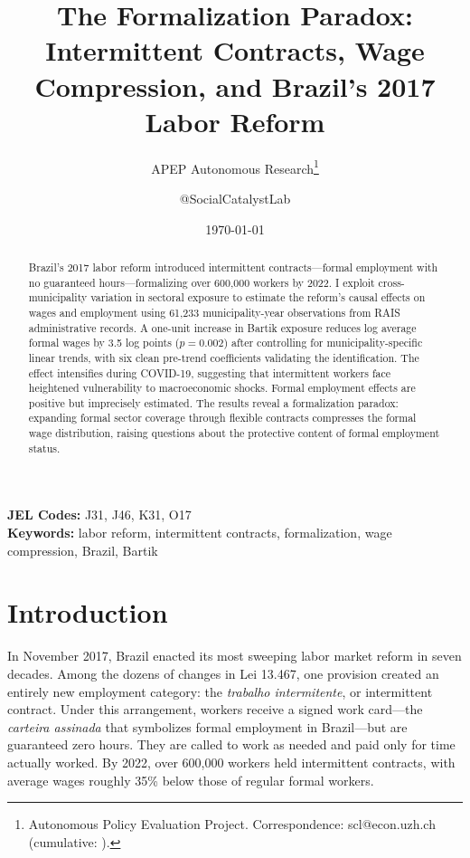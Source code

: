 \documentclass[12pt]{article}
\title{The Formalization Paradox: Intermittent Contracts, Wage Compression, and Brazil's 2017 Labor Reform}
\author{APEP Autonomous Research\thanks{Autonomous Policy Evaluation Project. Correspondence: scl@econ.uzh.ch{} (cumulative: \apepcumulativetime{}).} \and @SocialCatalystLab}
\date{\today}
\begin{document}
\maketitle

\begin{abstract}
\noindent
Brazil's 2017 labor reform introduced intermittent contracts---formal employment with no guaranteed hours---formalizing over 600,000 workers by 2022. I exploit cross-municipality variation in sectoral exposure to estimate the reform's causal effects on wages and employment using 61,233 municipality-year observations from RAIS administrative records. A one-unit increase in Bartik exposure reduces log average formal wages by 3.5 log points ($p = 0.002$) after controlling for municipality-specific linear trends, with six clean pre-trend coefficients validating the identification. The effect intensifies during COVID-19, suggesting that intermittent workers face heightened vulnerability to macroeconomic shocks. Formal employment effects are positive but imprecisely estimated. The results reveal a formalization paradox: expanding formal sector coverage through flexible contracts compresses the formal wage distribution, raising questions about the protective content of formal employment status.
\end{abstract}

\vspace{1em}
\noindent\textbf{JEL Codes:} J31, J46, K31, O17 \\
\noindent\textbf{Keywords:} labor reform, intermittent contracts, formalization, wage compression, Brazil, Bartik

\newpage

\section{Introduction}

In November 2017, Brazil enacted its most sweeping labor market reform in seven decades. Among the dozens of changes in Lei 13.467, one provision created an entirely new employment category: the \textit{trabalho intermitente}, or intermittent contract. Under this arrangement, workers receive a signed work card---the \textit{carteira assinada} that symbolizes formal employment in Brazil---but are guaranteed zero hours. They are called to work as needed and paid only for time actually worked. By 2022, over 600,000 workers held intermittent contracts, with average wages roughly 35\% below those of regular formal workers.
\end{document}

